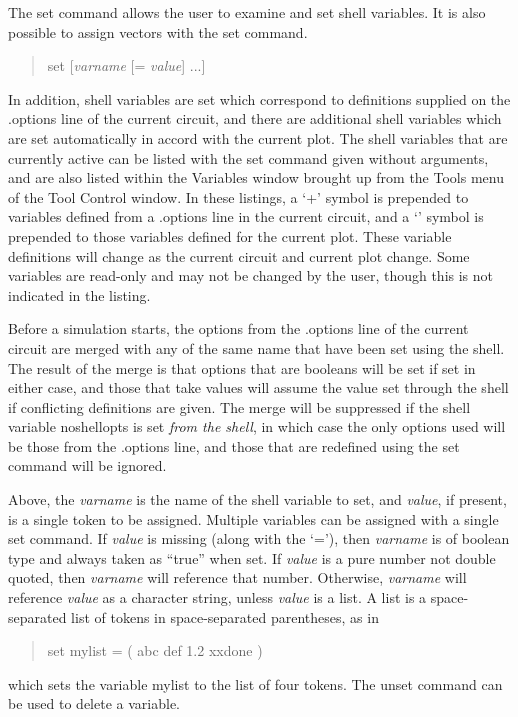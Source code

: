 
The {\cb set} command allows the user to examine and set shell
variables.  It is also possible to assign vectors with the {\cb set}
command.
\begin{quote}\vt
set [{\it varname} [= {\it value}] ...]
\end{quote}
In addition, shell variables are set which correspond to definitions
supplied on the {\vt .options} line of the current circuit, and there
are additional shell variables which are set automatically in accord
with the current plot.  The shell variables that are currently active
can be listed with the {\cb set} command given without arguments, and
are also listed within the {\cb Variables} window brought up from the
{\cb Tools} menu of the {\cb Tool Control} window.  In these listings,
a `{\vt +}' symbol is prepended to variables defined from a {\vt
.options} line in the current circuit, and a `{\vt *}' symbol is
prepended to those variables defined for the current plot.  These
variable definitions will change as the current circuit and current
plot change.  Some variables are read-only and may not be changed by
the user, though this is not indicated in the listing.

Before a simulation starts, the options from the {\vt .options} line
of the current circuit are merged with any of the same name that have
been set using the shell.  The result of the merge is that options
that are booleans will be set if set in either case, and those that
take values will assume the value set through the shell if conflicting
definitions are given.  The merge will be suppressed if the shell
variable {\et noshellopts} is set {\it from the shell}, in which case
the only options used will be those from the {\vt .options} line, and
those that are redefined using the {\cb set} command will be ignored.

Above, the {\it varname} is the name of the shell variable to set, and
{\it value}, if present, is a single token to be assigned. 
Multiple variables can be assigned with a single {\cb set} command. 
If {\it value} is missing (along with the `{\vt =}'), then {\it
varname} is of boolean type and always taken as ``true'' when set. 
If {\it value} is a pure number not double quoted, then {\it
varname} will reference that number.  Otherwise, {\it varname} will
reference {\it value} as a character string, unless {\it value} is
a list.  A list is a space-separated list of tokens in space-separated
parentheses, as in
\begin{quote}\vt
set mylist = ( abc def 1.2 xxdone )
\end{quote}
which sets the variable {\vt mylist} to the list of four tokens.  The
{\cb unset} command can be used to delete a variable.

